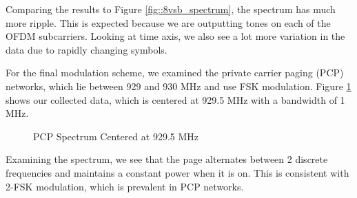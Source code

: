 \documentclass{article}
\begin{document}
Comparing the results to Figure \ref{fig::8vsb_spectrum}, the spectrum has much more ripple. This is expected because we are outputting tones on each of the OFDM subcarriers. Looking at time axis, we also see a lot more variation in the data due to rapidly changing symbols.

For the final modulation scheme, we examined the private carrier paging (PCP) networks, which lie between 929 and 930 MHz and use FSK modulation. Figure \ref{fig::930MHz_fsk_spectrum} shows our collected data, which is centered at 929.5 MHz with a bandwidth of 1 MHz.

\begin{figure}[H]
	\centerline{}
	\caption{PCP Spectrum Centered at 929.5 MHz}
	\label{fig::930MHz_fsk_spectrum}
\end{figure}

Examining the spectrum, we see that the page alternates between 2 discrete frequencies and maintains a constant power when it is on. This is consistent with 2-FSK modulation, which is prevalent in PCP networks.



\end{document}

